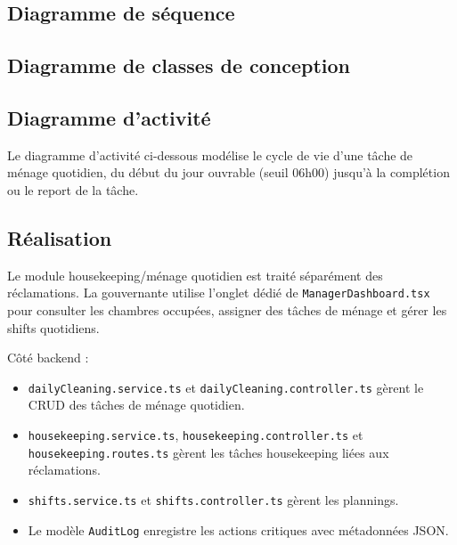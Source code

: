 \subsection{Diagramme de séquence}

\subsection{Diagramme de classes de conception}

\subsection{Diagramme d'activité}
Le diagramme d'activité ci-dessous modélise le cycle de vie d'une tâche de ménage quotidien, du début du jour ouvrable (seuil 06h00) jusqu'à la complétion ou le report de la tâche.


\subsection{Réalisation}
Le module housekeeping/ménage quotidien est traité séparément des réclamations. La gouvernante utilise l'onglet dédié de \texttt{ManagerDashboard.tsx} pour consulter les chambres occupées, assigner des tâches de ménage et gérer les shifts quotidiens.

Côté backend :
\begin{itemize}
\item \texttt{dailyCleaning.service.ts} et \texttt{dailyCleaning.controller.ts} gèrent le CRUD des tâches de ménage quotidien.
\item \texttt{housekeeping.service.ts}, \texttt{housekeeping.controller.ts} et \texttt{housekeeping.routes.ts} gèrent les tâches housekeeping liées aux réclamations.
\item \texttt{shifts.service.ts} et \texttt{shifts.controller.ts} gèrent les plannings.
\item Le modèle \texttt{AuditLog} enregistre les actions critiques avec métadonnées JSON.
\end{itemize}


